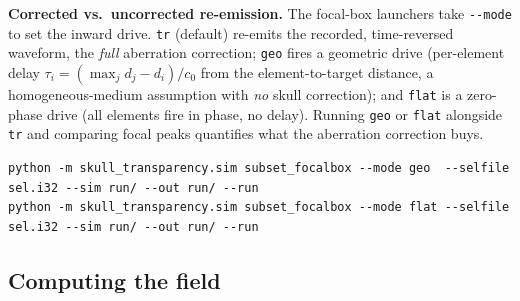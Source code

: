 \documentclass[10pt]{article}
\newcommand{\code}[1]{\lstinline[basicstyle=\ttfamily]|#1|}
\begin{document}
\textbf{Corrected vs.\ uncorrected re-emission.} The focal-box launchers take
\code{--mode} to set the inward drive. \code{tr} (default) re-emits the recorded,
time-reversed waveform, the \emph{full} aberration correction; \code{geo} fires a
geometric drive (per-element delay $\tau_i=(\max_j d_j-d_i)/c_0$ from the
element-to-target distance, a homogeneous-medium assumption with \emph{no} skull
correction); and \code{flat} is a zero-phase drive (all elements fire in phase, no
delay). Running \code{geo} or \code{flat} alongside \code{tr} and comparing focal peaks
quantifies what the aberration correction buys.
\begin{lstlisting}[style=sh]
python -m skull_transparency.sim subset_focalbox --mode geo  --selfile sel.i32 --sim run/ --out run/ --run
python -m skull_transparency.sim subset_focalbox --mode flat --selfile sel.i32 --sim run/ --out run/ --run
\end{lstlisting}

\subsection{Computing the field}
\end{document}
